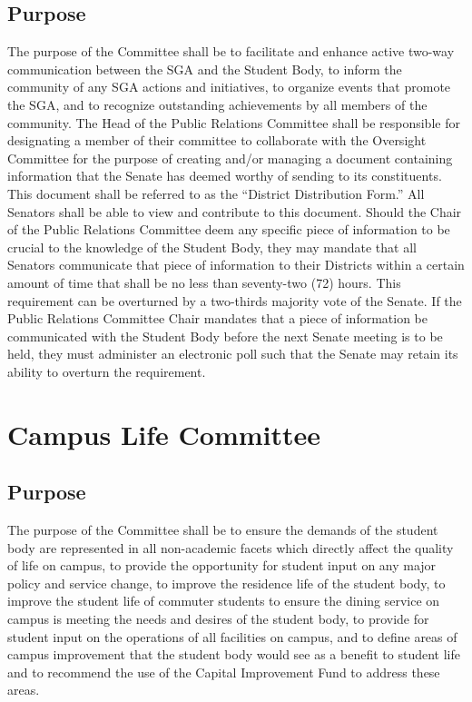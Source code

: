 \documentclass[12pt]{scrreprt}
\begin{document}
\subsection{Purpose}
The purpose of the Committee shall be to facilitate and enhance active two-way
communication between the SGA and the Student Body, to inform the community of 
any SGA actions and initiatives, to organize events that promote the SGA, and 
to recognize outstanding achievements by all members of the community. The Head of the Public Relations Committee shall be responsible for designating a member of their committee to collaborate with the Oversight Committee for the purpose of creating and/or managing a document containing information that the Senate has deemed worthy of sending to its constituents. This document shall be referred to as the “District Distribution Form.” All Senators shall be able to view and contribute to this document. 
Should the Chair of the Public Relations Committee deem any specific piece of information to be crucial to the knowledge of the Student Body, they may mandate that all Senators communicate that piece of information to their Districts within a certain amount of time that shall be no less than seventy-two (72) hours. This requirement can be overturned by a two-thirds majority vote of the Senate. If the Public Relations Committee Chair mandates that a piece of information be communicated with the Student Body before the next Senate meeting is to be held, they must administer an electronic poll such that the Senate may retain its ability to overturn the requirement.

\section{Campus Life Committee}

\subsection{Purpose}
The purpose of the Committee shall be to ensure the demands of the student 
body are represented in all non-academic facets which directly affect the 
quality of life on campus, to provide the opportunity for student input on any 
major policy and service change, to improve the residence life of the student 
body, to improve the student life of commuter students to ensure the dining 
service on campus is meeting the needs and desires of the student body, to 
provide for student input on the operations of all facilities on campus, and 
to define areas of campus improvement that the student body would see as a 
benefit to student life and to recommend the use of the Capital Improvement 
Fund to address these areas.
\end{document}
